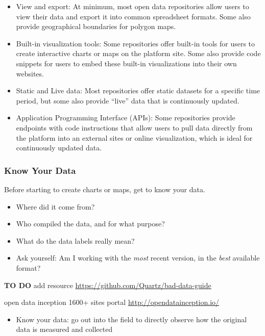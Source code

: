 \documentclass[
  english,
]{book}
\providecommand{\tightlist}{%
  \setlength{\itemsep}{0pt}\setlength{\parskip}{0pt}}
\begin{document}
\begin{itemize}
\tightlist
\item
  View and export: At minimum, most open data repositories allow users to view their data and export it into common spreadsheet formats. Some also provide geographical boundaries for polygon maps.
\item
  Built-in visualization tools: Some repositories offer built-in tools for users to create interactive charts or maps on the platform site. Some also provide code snippets for users to embed these built-in visualizations into their own websites.
\item
  Static and Live data: Most repositories offer static datasets for a specific time period, but some also provide ``live'' data that is continuously updated.
\item
  Application Programming Interface (APIs): Some repositories provide endpoints with code instructions that allow users to pull data directly from the platform into an external sites or online visualization, which is ideal for continuously updated data.
\end{itemize}

\hypertarget{know-your-data}{%
\subsubsection{Know Your Data}\label{know-your-data}}

Before starting to create charts or maps, get to know your data.

\begin{itemize}
\tightlist
\item
  Where did it come from?
\item
  Who compiled the data, and for what purpose?
\item
  What do the data labels really mean?
\item
  Ask yourself: Am I working with the \emph{most} recent version, in the \emph{best} available format?
\end{itemize}

\textbf{TO DO} add resource \url{https://github.com/Quartz/bad-data-guide}

open data inception 1600+ sites portal
\url{http://opendatainception.io/}

\begin{itemize}
\tightlist
\item
  Know your data: go out into the field to directly observe how the original data is measured and collected
\end{itemize}
\end{document}
